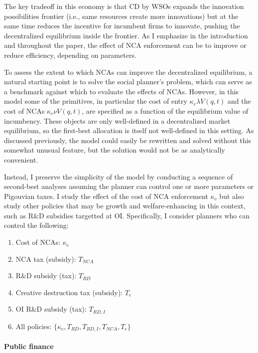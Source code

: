 \documentclass[11pt,english]{article}
\begin{document}
The key tradeoff in this economy is that CD by WSOs expands the innovation possibilities frontier (i.e., same resources create more innovations) but at the same time reduces the incentive for incumbent firms to innovate, pushing the decentralized equilibrium inside the frontier. As I emphasize in the introduction and throughout the paper, the effect of NCA enforcement can be to improve or reduce efficiency, depending on parameters. 

To assess the extent to which NCAs can improve the decentralized equilibrium, a natural starting point is to solve the social planner's problem, which can serve as a benchmark against which to evaluate the effects of NCAs. However, in this model some of the primitives, in particular the cost of entry $\kappa_e \lambda V(q,t)$ and the cost of NCAs $\kappa_c \nu V(q,t)$, are specified as a function of the equilibrium value of incumbency. These objects are only well-defined in a decentralized market equilibrium, so the first-best allocation is itself not well-defined in this setting. As discussed previously, the model could easily be rewritten and solved without this somewhat unusual feature, but the solution would not be as analytically convenient. 

Instead, I preserve the simplicity of the model by conducting a sequence of second-best analyses assuming the planner can control one or more parameters or Pigouvian taxes. I study the effect of the cost of NCA enforcement $\kappa_c$ but also study other policies that may be growth and welfare-enhancing in this context, such as R\&D subsidies targetted at OI. Specifically, I consider planners who can control the following: 

\begin{enumerate}
	\item Cost of NCAs: $\kappa_c$ 
	\item NCA tax (subsidy): $T_{NCA}$
	\item R\&D subsidy (tax): $T_{RD}$
	\item Creative destruction tax (subsidy): $T_e$
	\item OI R\&D subsidy (tax): $T_{RD,I}$
	\item All policies: $\{\kappa_c, T_{RD}, T_{RD,I}, T_{NCA}, T_e\}$
\end{enumerate}

\paragraph{Public finance} 
\end{document}
